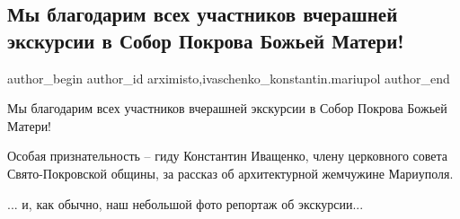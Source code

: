  
 
 
 
 

\subsection{Мы благодарим всех участников вчерашней экскурсии в Собор Покрова Божьей Матери!}
\label{sec:06_09_2021.fb.arximisto.1.blagodarim_ekskursia_sobor_pokrova_bozhjej_materi}
 
\ifcmt
 author_begin
   author_id arximisto,ivaschenko_konstantin.mariupol
 author_end
\fi

Мы благодарим всех участников вчерашней экскурсии в Собор Покрова Божьей
Матери!

Особая признательность – гиду Константин Иващенко, члену церковного совета
Свято-Покровской общины, за рассказ об архитектурной жемчужине Мариуполя.

... и, как обычно, наш небольшой фото репортаж об экскурсии...

